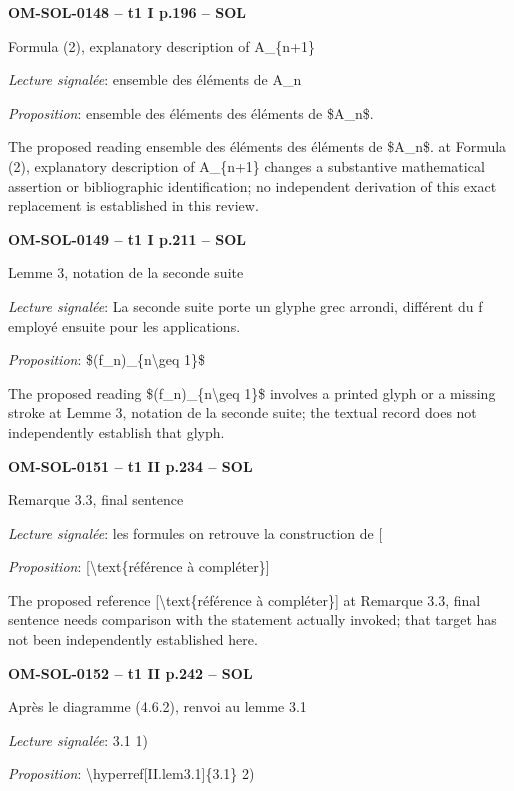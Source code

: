 \par\noindent\textbf{OM-SOL-0148 -- t1 I p.196 -- SOL}\par
Formula (2), explanatory description of A\_\{n+1\}\par
\emph{Lecture signalée}: ensemble des éléments de A\_n\par
\emph{Proposition}: ensemble des éléments des éléments de \$A\_n\$.\par
The proposed reading ensemble des éléments des éléments de \$A\_n\$. at Formula (2), explanatory description of A\_\{n+1\} changes a substantive mathematical assertion or bibliographic identification; no independent derivation of this exact replacement is established in this review.\par
\par\noindent\textbf{OM-SOL-0149 -- t1 I p.211 -- SOL}\par
Lemme 3, notation de la seconde suite\par
\emph{Lecture signalée}: La seconde suite porte un glyphe grec arrondi, différent du f employé ensuite pour les applications.\par
\emph{Proposition}: \$(f\_n)\_\{n\textbackslash{}geq 1\}\$\par
The proposed reading \$(f\_n)\_\{n\textbackslash{}geq 1\}\$ involves a printed glyph or a missing stroke at Lemme 3, notation de la seconde suite; the textual record does not independently establish that glyph.\par
\par\noindent\textbf{OM-SOL-0151 -- t1 II p.234 -- SOL}\par
Remarque 3.3, final sentence\par
\emph{Lecture signalée}: les formules on retrouve la construction de [\par
\emph{Proposition}: [\textbackslash{}text\{référence à compléter\}]\par
The proposed reference [\textbackslash{}text\{référence à compléter\}] at Remarque 3.3, final sentence needs comparison with the statement actually invoked; that target has not been independently established here.\par
\par\noindent\textbf{OM-SOL-0152 -- t1 II p.242 -- SOL}\par
Après le diagramme (4.6.2), renvoi au lemme 3.1\par
\emph{Lecture signalée}: 3.1 1)\par
\emph{Proposition}: \textbackslash{}hyperref[II.lem3.1]\{3.1\} 2)\par
